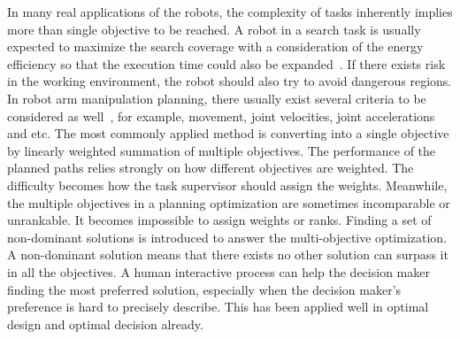 \documentclass[conference]{IEEEtran}
\theoremstyle{definition}
\begin{document}

In many real applications of the robots, the complexity of tasks inherently implies more than single objective to be reached.
A robot in a search task is usually expected to maximize the search coverage with a consideration of the energy efficiency so that the execution time could also be expanded~\cite{yi2014supporting}. 
If there exists risk in the working environment, the robot should also try to avoid dangerous regions.
In robot arm manipulation planning, there usually exist several criteria to be considered as well~\cite{Pires2004}, for example, movement, joint velocities, joint accelerations and etc. 
The most commonly applied method is converting into a single objective by linearly weighted summation of multiple objectives.
The performance of the planned paths relies strongly on how different objectives are weighted.
The difficulty becomes how the task supervisor should assign the weights.
Meanwhile, the multiple objectives in a planning optimization are sometimes incomparable or unrankable.
It becomes impossible to assign weights or ranks.
Finding a set of non-dominant solutions is introduced to answer the multi-objective optimization.
A non-dominant solution means that there exists no other solution can surpass it in all the objectives.
A human interactive process can help the decision maker finding the most preferred solution, especially when the decision maker's preference is hard to precisely describe.
This has been applied well in optimal design and optimal decision already.
\end{document}
